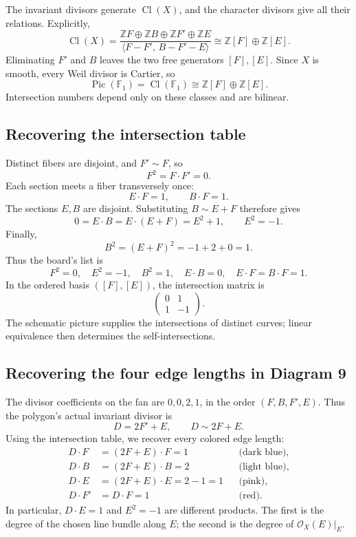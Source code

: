\documentclass[11pt]{article}
\theoremstyle{definition}
\theoremstyle{remark}
\DeclareMathOperator{\Cl}{Cl}
\DeclareMathOperator{\Pic}{Pic}
\newcommand{\cO}{\mathcal{O}}
\newcommand{\bZ}{\mathbb{Z}}
\newcommand{\bF}{\mathbb{F}}
\newcommand{\isom}{\cong}
\begin{document}
The invariant divisors generate \(\Cl(X)\), and the character
divisors give all their relations. Explicitly,
\[
    \Cl(X)=
    \frac{\bZ F\oplus\bZ B\oplus\bZ F'\oplus\bZ E}
         {\langle F-F',\,B-F'-E\rangle}
    \isom\bZ[F]\oplus\bZ[E].
\]
Eliminating \(F'\) and \(B\) leaves the two free generators
\([F],[E]\). Since \(X\) is smooth, every Weil divisor is Cartier,
so
\[
    \boxed{\Pic(\bF_1)=\Cl(\bF_1)
                  \isom\bZ[F]\oplus\bZ[E].}
\]
Intersection numbers depend only on these classes and are bilinear.

\subsection{Recovering the intersection table}

Distinct fibers are disjoint, and \(F'\sim F\), so
\[
    F^2=F\cdot F'=0.
\]
Each section meets a fiber transversely once:
\[
    E\cdot F=1,\qquad B\cdot F=1.
\]
The sections \(E,B\) are disjoint. Substituting \(B\sim E+F\)
therefore gives
\[
    0=E\cdot B=E\cdot(E+F)=E^2+1,
    \qquad E^2=-1.
\]
Finally,
\[
    B^2=(E+F)^2=-1+2+0=1.
\]
Thus the board's list is
\[
    \boxed{F^2=0,\quad E^2=-1,\quad B^2=1,\quad
           E\cdot B=0,\quad E\cdot F=B\cdot F=1.}
\]
In the ordered basis \(([F],[E])\), the intersection matrix is
\[
    \begin{pmatrix}0&1\\1&-1\end{pmatrix}.
\]
The schematic picture supplies the intersections of distinct curves;
linear equivalence then determines the self-intersections.

\subsection{Recovering the four edge lengths in Diagram 9}

The divisor coefficients on the fan are \(0,0,2,1\), in the order
\((F,B,F',E)\). Thus the polygon's actual invariant divisor is
\[
    D=2F'+E,\qquad D\sim2F+E.
\]
Using the intersection table, we recover every colored edge length:
\[
    \begin{aligned}
        D\cdot F  &=(2F+E)\cdot F=1
                      &&\text{(dark blue)},\\
        D\cdot B  &=(2F+E)\cdot B=2
                      &&\text{(light blue)},\\
        D\cdot E  &=(2F+E)\cdot E=2-1=1
                      &&\text{(pink)},\\
        D\cdot F' &=D\cdot F=1
                      &&\text{(red)}.
    \end{aligned}
\]
In particular, \(D\cdot E=1\) and \(E^2=-1\) are different products.
The first is the degree of the chosen line bundle along \(E\);
the second is the degree of \(\cO_X(E)|_E\).
\end{document}
